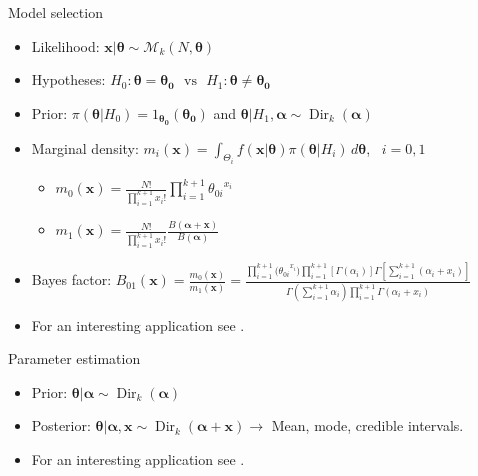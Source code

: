 \begin{frame}{Model selection}

\begin{itemize}

\item Likelihood: $\bm{x}|\bm{\theta} \sim \mathcal{M}_k(N,\bm{\theta})$

\item Hypotheses:  $ H_0: \bm{\theta}=\bm{\theta_0} \,\,\,\, \text{vs} \,\,\,\,  H_1: \bm{\theta} \neq \bm{\theta_0}$

\item Prior: $\pi(\bm{\theta}|H_0)={1_{\bm{\theta_0}}(\bm{\theta_0})}$ and $\bm{\theta}|H_1, \bm{\alpha} \sim \operatorname{Dir}_k(\bm{\alpha})$ 

\item Marginal density: $m_i(\bm{x})=\int_{\Theta_i} f(\bm{x}|\bm{\theta})\pi(\bm{\theta}|H_i) \, d\bm{\theta} $, \, $i=0,1$

\begin{itemize}

\item  $m_0(\bm{x})=\frac{N!}{\prod_{i=1}^{k+1}x_i!}\prod_{i=1}^{k+1}{\theta_{0i}}^{x_i}$ 
\item  $m_1(\bm{x})= \frac{N!}{\prod_{i=1}^{k+1}x_i!}\frac{B(\bm{\alpha}+\bm{x})}{B(\bm{\alpha})}$ 

\end{itemize}

\item Bayes factor: $B_{01}(\bm{x}) = \frac{m_0(\bm{x})}{m_1(\bm{x})} = \frac{\prod_{i=1}^{k+1}{(\theta_{0i}}^{x_i}) \prod_{i=1}^{k+1}[\Gamma(\alpha_i)] \Gamma [\sum_{i=1}^{k+1}(\alpha_i+x_i)]}{\Gamma(\sum_{i=1}^{k+1} \alpha_i) \prod_{i=1}^{k+1}\Gamma(\alpha_i+x_i)}$

\item For an interesting application see \citet{pericchiTorres2011}.

\end{itemize}

\end{frame}


\begin{frame}{Parameter estimation}

\begin{itemize}

\item Prior: $\bm{\theta}|\bm{\alpha} \sim \operatorname{Dir}_k(\bm{\alpha})$

\item Posterior: $\bm{\theta} | \bm{\alpha}, \bm{x} \sim \operatorname{Dir}_k(\bm{\alpha} + \bm{x}) \rightarrow$ Mean, mode, credible intervals.

\item For an interesting application see \citet{ley1996peculiar}.


\end{itemize}

\end{frame}

